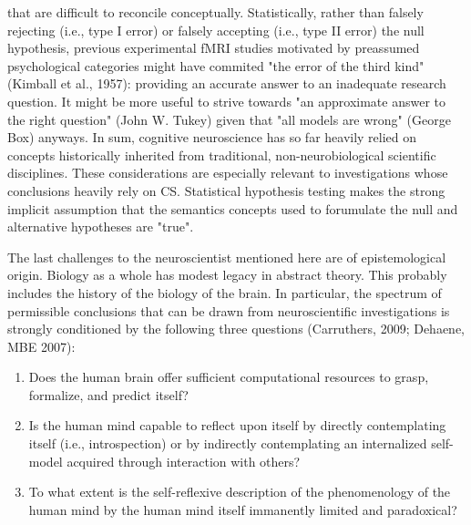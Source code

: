 \documentclass[authoryear,review,3p]{elsarticle}
\begin{document}
that are difficult to reconcile conceptually.
%
Statistically, rather than falsely rejecting (i.e., type I error) or
falsely accepting (i.e., type II error) the null hypothesis,
previous experimental fMRI studies motivated by
preassumed psychological categories might have commited
"the error of the third kind" (Kimball et al., 1957):
providing an accurate answer to an inadequate research question.
It might be more useful to
strive towards "an approximate answer to the right question"
(John W. Tukey) given that "all models are wrong" (George Box) anyways.
%
In sum,
cognitive neuroscience has so far heavily relied on concepts
historically inherited from traditional,
non-neurobiological scientific disciplines.
These considerations are especially relevant to investigations
whose conclusions heavily rely on CS.
Statistical hypothesis testing makes the
strong implicit assumption that
the semantics concepts used to forumulate 
the null and alternative hypotheses are "true".


The last challenges to the neuroscientist
mentioned here are of epistemological origin.
Biology as a whole has modest legacy in abstract theory.
This probably includes the history of the biology of the brain.
In particular,
the spectrum of permissible conclusions
that can be drawn from neuroscientific investigations is strongly conditioned
by the following three questions
(Carruthers, 2009; Dehaene, MBE 2007):
\begin{enumerate}
  \item Does the human brain offer sufficient computational resources
  to grasp, formalize, and predict itself?
  \item Is the human mind capable to reflect upon itself
by directly contemplating itself (i.e., introspection) or by
indirectly contemplating an internalized self-model acquired through
interaction with others?
  \item To what extent is the self-reflexive description of the phenomenology of
  the human mind by the human mind itself immanently
  limited and paradoxical?
\end{enumerate}
\end{document}
